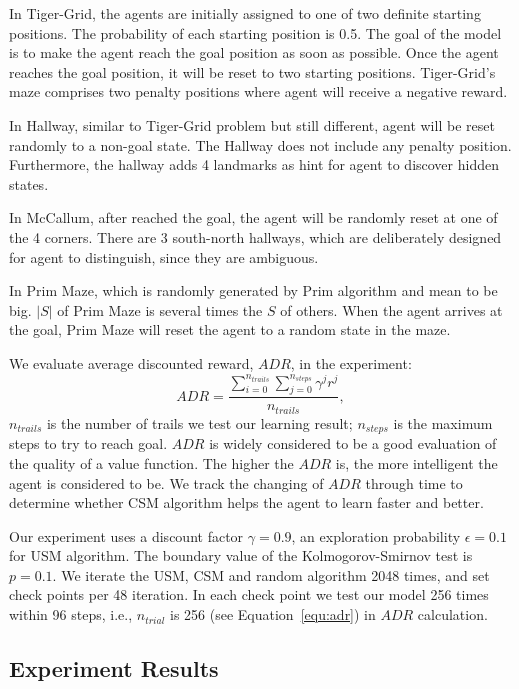 \documentclass[conference]{IEEEtran}
\begin{document}
	In Tiger-Grid, the agents are initially assigned to one of two definite starting positions.
	The probability of each starting position is 0.5. The goal of the model is to make the agent
	reach the goal position as soon as possible. Once the agent reaches the goal position,
	it will be reset to two starting positions. Tiger-Grid's maze comprises two penalty positions
	where agent will receive a negative reward. 
	
	In Hallway, similar to Tiger-Grid problem but still different, agent will be reset randomly
	to a non-goal state. The Hallway does not include any penalty position. Furthermore, the hallway
	adds 4 landmarks as hint for agent to discover hidden states.
	
	In McCallum, after reached the goal, the agent will be randomly reset at one of the 4 corners.
	There are 3 south-north hallways, which are deliberately designed for agent to distinguish, since
	they are ambiguous. 
	
	In Prim Maze, which is randomly generated by Prim algorithm and mean to be big. $|S|$ of Prim Maze
	is several times the $S$ of others. When the agent arrives at the goal, Prim Maze will reset
	the agent to a random state in the maze.
	
	We evaluate average discounted reward, $ADR$, in the experiment:
	\begin{equation}
	ADR = \frac{\sum_{i=0}^{n_{trails}} \sum_{j=0}^{n_{steps}} \gamma^j r^j}{n_{trails}}, \label{equ:adr}
	\end{equation}
	$n_{trails}$ is the number of trails we test our learning result; $n_{steps}$ is the maximum
	steps to try to reach goal. $ADR$ is widely considered to be a good evaluation of the quality of
	a value function. The higher the $ADR$ is, the more intelligent the agent is considered to be.
	We track the changing of $ADR$ through time to determine whether CSM algorithm helps the agent to learn
	faster and better.
	
	Our experiment uses a discount factor $\gamma=0.9$, an exploration probability $\epsilon=0.1$ for USM algorithm.
	The boundary value of the Kolmogorov-Smirnov test is $p=0.1$. We iterate the USM, CSM and random algorithm
	2048 times, and set check points per 48 iteration. In each check point we test our model 256 times
	within 96 steps, i.e., $n_{trial}$ is 256 (see Equation~\ref{equ:adr}) in $ADR$ calculation.
	
	\subsection{Experiment Results}
	
\end{document}
